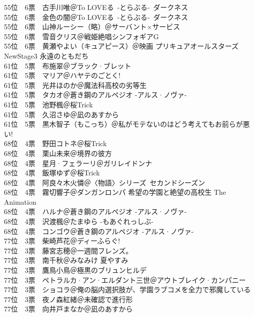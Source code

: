 { 55位　6票　古手川唯＠To LOVEる~-とらぶる-~ダークネス\\
 55位　6票　金色の闇＠To LOVEる~-とらぶる-~ダークネス\\
 55位　6票　山神ルーシー（略）＠サーバント×サービス\\
 55位　6票　雪音クリス＠戦姫絶唱シンフォギアG\\
 55位　6票　黄瀬やよい（キュアピース）＠映画 プリキュアオールスターズNewStage3 永遠のともだち\\
 61位　5票　布施翠＠ブラック·ブレット\\
 61位　5票　マリア＠ハヤテのごとく!\\
 61位　5票　光井ほのか＠魔法科高校の劣等生\\
 61位　5票　タカオ＠蒼き鋼のアルペジオ -アルス·ノヴァ-\\
 61位　5票　池野楓＠桜Trick\\
 61位　5票　久沼さゆ＠凪のあすから\\
 61位　5票　黒木智子（もこっち）＠私がモテないのはどう考えてもお前らが悪い!\\
 68位　4票　野田コトネ＠桜Trick\\
 68位　4票　栗山未来＠境界の彼方\\
 68位　4票　星月·フェラーリ＠ガリレイドンナ\\
 68位　4票　飯塚ゆず＠桜Trick\\
 68位　4票　阿良々木火憐＠〈物語〉シリーズ~セカンドシーズン\\
 68位　4票　霧切響子＠ダンガンロンパ 希望の学園と絶望の高校生 The Animation\\
 68位　4票　ハルナ＠蒼き鋼のアルペジオ -アルス·ノヴァ-\\
 68位　4票　沢渡楓＠たまゆら -もあぐれっしぶ-\\
 68位　4票　コンゴウ＠蒼き鋼のアルペジオ -アルス·ノヴァ-\\
 77位　3票　柴崎芦花＠ディーふらぐ!\\
 77位　3票　藤宮志穂＠一週間フレンズ。\\
 77位　3票　南千秋＠みなみけ 夏やすみ\\
 77位　3票　鷹鳥小鳥＠極黒のブリュンヒルデ\\
 77位　3票　ペトラルカ·アン·エルダント三世＠アウトブレイク·カンパニー\\
 77位　3票　ショコラ＠俺の脳内選択肢が、学園ラブコメを全力で邪魔している\\
 77位　3票　夜ノ森紅緒＠未確認で進行形\\
 77位　3票　向井戸まなか＠凪のあすから\\
}
